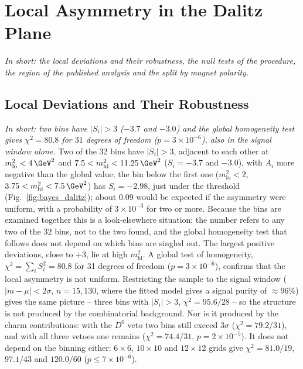 \FloatBarrier

\section{Local Asymmetry in the Dalitz Plane}
\label{app:ext_dalitz}
\emph{In short: the local deviations and their robustness, the null tests of the procedure, the region of the published analysis and the split by magnet polarity.}

\subsection{Local Deviations and Their Robustness}
\emph{In short: two bins have $|S_i|>3$ ($-3.7$ and $-3.0$) and the global homogeneity test gives $\chi^2=80.8$ for $31$ degrees of freedom ($p=3\times10^{-6}$), also in the signal window alone.}
Two of the 32 bins have $|S_i|>3$, adjacent to each other at $m^2_{\mathrm{lo}}<4\,\GeV^2$ and $7.5<m^2_{\mathrm{hi}}<11.25\,\GeV^2$ ($S_i=-3.7$ and $-3.0$), with $A_i$ more negative than the global value; the bin below the first one ($m^2_{\mathrm{lo}}<2$, $3.75<m^2_{\mathrm{hi}}<7.5\,\GeV^2$) has $S_i=-2.98$, just under the threshold (Fig.~\ref{fig:bayes_dalitz}); about $0.09$ would be expected if the asymmetry were uniform, with a probability of $3\times10^{-3}$ for two or more. Because the bins are examined together this is a look-elsewhere situation: the number refers to any two of the $32$ bins, not to the two found, and the global homogeneity test that follows does not depend on which bins are singled out. The largest positive deviations, close to $+3$, lie at high $m^2_{\mathrm{hi}}$. A global test of homogeneity, $\chi^2=\sum_i S_i^2=80.8$ for 31 degrees of freedom ($p=3\times10^{-6}$), confirms that the local asymmetry is not uniform. Restricting the sample to the signal window ($|m-\mu|<2\sigma$, $n=15{,}130$, where the fitted model gives a signal purity of $\approx$96\%) gives the same picture -- three bins with $|S_i|>3$, $\chi^2=95.6/28$ -- so the structure is not produced by the combinatorial background. Nor is it produced by the charm contributions: with the $D^0$ veto two bins still exceed $3\sigma$ ($\chi^2=79.2/31$), and with all three vetoes one remains ($\chi^2=74.4/31$, $p=2\times10^{-5}$). It does not depend on the binning either: $6\times6$, $10\times10$ and $12\times12$ grids give $\chi^2=81.0/19$, $97.1/43$ and $120.0/60$ ($p\leq7\times10^{-6}$).

